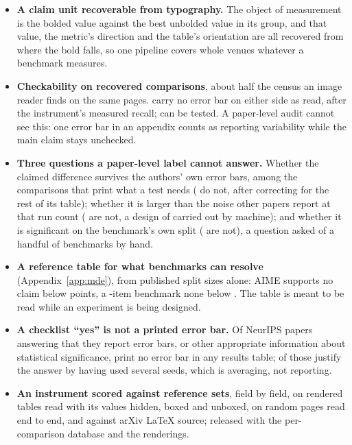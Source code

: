 \documentclass{article}
\begin{document}
\begin{itemize}
\item \textbf{A claim unit recoverable from typography.} The object of
  measurement is the bolded value against the best unbolded value in its group,
  and that value, the metric's direction and the table's orientation are all
  recovered from where the bold falls, so one pipeline covers whole venues
  whatever a benchmark measures.
\item \textbf{Checkability on \nComparisonsTwentyFive{} recovered comparisons},
  about half the census an image reader finds on the same pages.
  \nPctNeitherSide{} carry no error bar on either side as read,
  \nHeadlineWithComparisonAudit{} after the instrument's measured recall;
  \nPctTestable{} can be tested. A paper-level audit cannot see this: one
  error bar in an appendix counts as reporting variability while the main
  claim stays unchecked.
\item \textbf{Three questions a paper-level label cannot answer.} Whether the
  claimed difference survives the authors' own error bars, among the
  comparisons that print what a test needs (\nPctFail{} do not,
  \nPctFailHolm{} after correcting for the rest of its table); whether it is
  larger than the noise other papers report at that run count
  (\nPctBelowAlphaThreshold{} are not, a design of
  \citet{christodoulou2025false} carried out by machine); and whether it is
  significant on the benchmark's own split (\nResolutionPctBelowSig{} are
  not), a question \citet{card2020with} asked of a handful of benchmarks by
  hand.
\item \textbf{A reference table for what benchmarks can resolve}
  (Appendix~\ref{app:mde}), from published split sizes alone: AIME supports no
  claim below \nAimeMde{} points, a \nFiveHundredItems{}-item benchmark none
  below \nFiveHundredMde{}. The table is meant to be read while an experiment
  is being designed.
\item \textbf{A checklist ``yes'' is not a printed error bar.} Of
  \nCheckYes{} NeurIPS papers answering that they report error bars, or other
  appropriate information about statistical significance, \nCheckYesNoTable{}
  print no error bar in any results table; \nJustSeeds{} of those justify the
  answer by having used several seeds, which is averaging, not reporting.
\item \textbf{An instrument scored against reference sets}, field by field,
  on rendered tables read with its values hidden, boxed and unboxed, on random
  pages read end to end, and against arXiv LaTeX source; released with the
  per-comparison database and the renderings.
\end{itemize}
\end{document}
